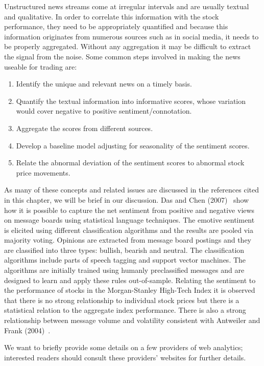 Unstructured news streams come at irregular intervals and are usually textual and qualitative. In order to correlate this information with the stock performance, they need to be appropriately quantified and because this information originates from numerous sources such as in social media, it needs to be properly aggregated. Without any aggregation it may be difficult to extract the signal from the noise. Some common steps involved in making the news useable for trading are:
	\begin{enumerate}[--]
	\item Identify the unique and relevant news on a timely basis.
	\item Quantify the textual information into informative scores, whose variation would cover negative to positive sentiment/connotation.
	\item Aggregate the scores from different sources.
	\item Develop a baseline model adjusting for seasonality of the sentiment scores.
	\item Relate the abnormal deviation of the sentiment scores to abnormal stock price movements. 
	\end{enumerate}
As many of these concepts and related issues are discussed in the references cited in this chapter, we will be brief in our discussion. Das and Chen (2007)~\cite{daschen} show how it is possible to capture the net sentiment from positive and negative views on message boards using statistical language techniques. The emotive sentiment is elicited using different classification algorithms and the results are pooled via majority voting. Opinions are extracted from message board postings and they are classified into three types: bullish, bearish and neutral. The classification algorithms include parts of speech tagging and support vector machines. The algorithms are initially trained using humanly preclassified messages and are designed to learn and apply these rules out-of-sample. Relating the sentiment to the performance of stocks in the Morgan-Stanley High-Tech Index it is observed that there is no strong relationship to individual stock prices but there is a statistical relation to the aggregate index performance. There is also a strong relationship between message volume and volatility consistent with Antweiler and Frank (2004)~\cite{antweiler2004all}.  


We want to briefly provide some details on a few providers of web analytics; interested readers should consult these providers' websites for further details.

